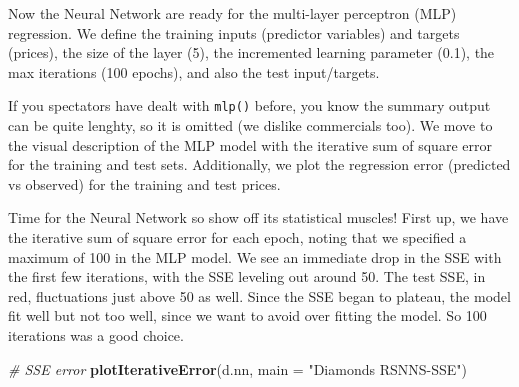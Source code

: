 \documentclass[]{book}
\newenvironment{Shaded}{\begin{snugshade}}{\end{snugshade}}
\newcommand{\CommentTok}[1]{\textcolor[rgb]{0.56,0.35,0.01}{\textit{#1}}}
\newcommand{\DataTypeTok}[1]{\textcolor[rgb]{0.13,0.29,0.53}{#1}}
\newcommand{\DecValTok}[1]{\textcolor[rgb]{0.00,0.00,0.81}{#1}}
\newcommand{\FloatTok}[1]{\textcolor[rgb]{0.00,0.00,0.81}{#1}}
\newcommand{\KeywordTok}[1]{\textcolor[rgb]{0.13,0.29,0.53}{\textbf{#1}}}
\newcommand{\NormalTok}[1]{#1}
\newcommand{\OperatorTok}[1]{\textcolor[rgb]{0.81,0.36,0.00}{\textbf{#1}}}
\newcommand{\OtherTok}[1]{\textcolor[rgb]{0.56,0.35,0.01}{#1}}
\newcommand{\StringTok}[1]{\textcolor[rgb]{0.31,0.60,0.02}{#1}}
\begin{document}
Now the Neural Network are ready for the multi-layer perceptron (MLP) regression. We define the training inputs (predictor variables) and targets (prices), the size of the layer (5), the incremented learning parameter (0.1), the max iterations (100 epochs), and also the test input/targets.

\begin{Shaded}
\end{Shaded}

If you spectators have dealt with \texttt{mlp()} before, you know the summary output can be quite lenghty, so it is omitted (we dislike commercials too). We move to the visual description of the MLP model with the iterative sum of square error for the training and test sets. Additionally, we plot the regression error (predicted vs observed) for the training and test prices.

Time for the Neural Network so show off its statistical muscles! First up, we have the iterative sum of square error for each epoch, noting that we specified a maximum of 100 in the MLP model. We see an immediate drop in the SSE with the first few iterations, with the SSE leveling out around 50. The test SSE, in red, fluctuations just above 50 as well. Since the SSE began to plateau, the model fit well but not too well, since we want to avoid over fitting the model. So 100 iterations was a good choice.

\begin{Shaded}
\begin{Highlighting}[]
\CommentTok{# SSE error}
\KeywordTok{plotIterativeError}\NormalTok{(d.nn, }\DataTypeTok{main =} \StringTok{"Diamonds RSNNS-SSE"}\NormalTok{)}
\end{Highlighting}
\end{Shaded}
\end{document}
